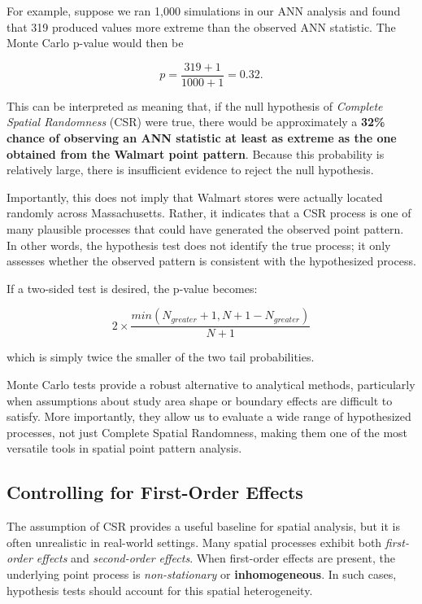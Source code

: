 \documentclass[
  letterpaper,
]{book}
\begin{document}
For example, suppose we ran 1,000 simulations in our ANN analysis and
found that 319 produced values more extreme than the observed ANN
statistic. The Monte Carlo p-value would then be

\[
p = \frac{319 + 1}{1000 + 1} = 0.32. 
\]

This can be interpreted as meaning that, if the null hypothesis of
\emph{Complete Spatial Randomness} (CSR) were true, there would be
approximately a \textbf{32\% chance of observing an ANN statistic at
least as extreme as the one obtained from the Walmart point pattern}.
Because this probability is relatively large, there is insufficient
evidence to reject the null hypothesis.

Importantly, this does not imply that Walmart stores were actually
located randomly across Massachusetts. Rather, it indicates that a CSR
process is one of many plausible processes that could have generated the
observed point pattern. In other words, the hypothesis test does not
identify the true process; it only assesses whether the observed pattern
is consistent with the hypothesized process.

If a two-sided test is desired, the p-value becomes:

\[
2 \times \dfrac{min(N_{greater}+1 , N + 1 - N_{greater})}{N+1}
\]

which is simply twice the smaller of the two tail probabilities.

Monte Carlo tests provide a robust alternative to analytical methods,
particularly when assumptions about study area shape or boundary effects
are difficult to satisfy. More importantly, they allow us to evaluate a
wide range of hypothesized processes, not just Complete Spatial
Randomness, making them one of the most versatile tools in spatial point
pattern analysis.

\subsection{Controlling for First-Order
Effects}\label{controlling-for-first-order-effects}

The assumption of CSR provides a useful baseline for spatial analysis,
but it is often unrealistic in real-world settings. Many spatial
processes exhibit both \emph{first-order effects} and \emph{second-order
effects}. When first-order effects are present, the underlying point
process is \emph{non-stationary} or \textbf{inhomogeneous}. In such
cases, hypothesis tests should account for this spatial heterogeneity.
\end{document}
